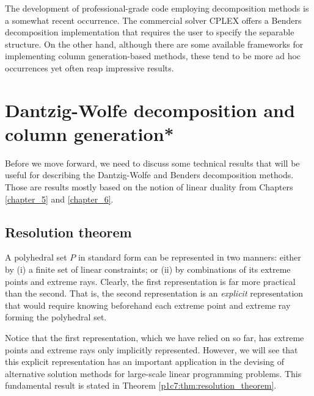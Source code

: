 The development of professional-grade code employing decomposition methods is a somewhat recent occurrence. The commercial solver CPLEX offers a Benders decomposition implementation that requires the user to specify the separable structure. On the other hand, although there are some available frameworks for implementing column generation-based methods, these tend to be more ad hoc occurrences yet often reap impressive results.  


\section{Dantzig-Wolfe decomposition and column generation*} \label{section_72}

Before we move forward, we need to discuss some technical results that will be useful for describing the Dantzig-Wolfe and Benders decomposition methods. Those are results mostly based on the notion of linear duality from Chapters \ref{chapter_5} and \ref{chapter_6}.

\subsection{Resolution theorem}


A polyhedral set $P$ in standard form can be represented in two manners: either by (i) a finite set of linear constraints; or (ii) by combinations of its extreme points and extreme rays. Clearly, the first representation is far more practical than the second. That is, the second representation is an \emph{explicit} representation that would require knowing beforehand each extreme point and extreme ray forming the polyhedral set. 

Notice that the first representation, which we have relied on so far, has extreme points and extreme rays only implicitly represented. However, we will see that this explicit representation has an important application in the devising of alternative solution methods for large-scale linear programming problems. This fundamental result is stated in Theorem \ref{p1c7:thm:resolution_theorem}. 

